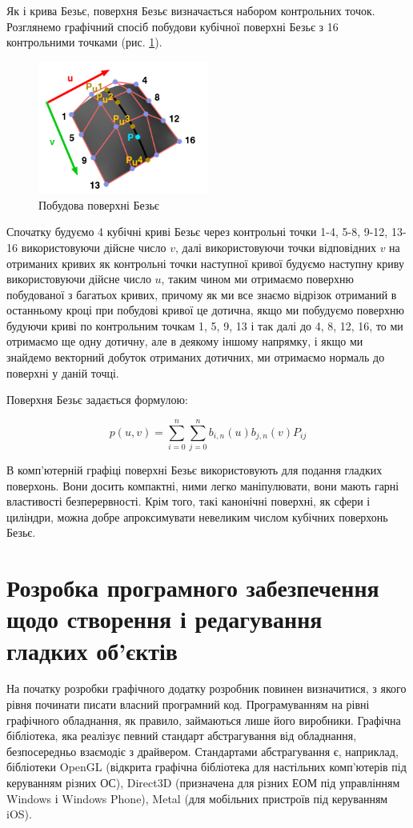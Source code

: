 \let\mypdfximage\pdfximage\def\pdfximage{\immediate\mypdfximage}\documentclass[14pt,a4paper]{extarticle}
\theoremstyle{definition}
\renewcommand{\[}{\begin{singlespace}\begin{equation*}}
\renewcommand{\]}{\end{equation*}\end{singlespace}}
\renewcommand{\+}{\discretionary{\mbox{\scriptsize$\hookleftarrow$}}{}{}}
\begin{document}
Як і крива Безьє, поверхня Безьє визначається набором контрольних точок. Розглянемо графічний спосіб побудови кубічної поверхні Безьє з 16 контрольними точками (рис. \ref{fig:bezier-surface}). 

\begin{figure}[!htb]
    \centering
    \includegraphics[width=0.5\textwidth]{bezier-surface.png}
    \caption{Побудова поверхні Безьє}\label{fig:bezier-surface}
\end{figure}

Спочатку будуємо 4 кубічні криві Безьє через контрольні точки 1-4, 5-8, 9-12, 13-16 використовуючи дійсне число $v$, далі використовуючи точки відповідних $v$ на отриманих кривих як контрольні точки наступної кривої будуємо наступну криву використовуючи дійсне число $u$, таким чином ми отримаємо поверхню побудованої з багатьох кривих, причому як ми все знаємо відрізок отриманий в останньому кроці при побудові кривої це дотична, якщо ми побудуємо поверхню будуючи криві по контрольним точкам 1, 5, 9, 13 і так далі до 4, 8, 12, 16, то ми отримаємо ще одну дотичну, але в деякому іншому напрямку, і якщо ми знайдемо векторний добуток отриманих дотичних, ми отримаємо нормаль до поверхні у даній точці.

Поверхня Безьє задається формулою:
\[p(u,v)=\sum_{i=0}^n\sum_{j=0}^n b_{i,n}(u) b_{j,n}(v) P_{ij}\]

В комп'ютерній графіці поверхні Безьє використовують для подання гладких поверхонь. Вони досить компактні, ними легко маніпулювати, вони мають гарні властивості безперервності. Крім того, такі канонічні поверхні, як сфери і циліндри, можна добре апроксимувати невеликим числом кубічних поверхонь Безьє.

\section{Розробка програмного забезпечення щодо створення і редагування гладких об'єктів}

На початку розробки графічного додатку розробник повинен визначитися, з якого рівня починати писати власний програмний код. Програмуванням на рівні графічного обладнання, як правило, займаються лише його виробники. Графічна бібліотека, яка реалізує певний стандарт абстрагування від обладнання, безпосередньо взаємодіє з драйвером. Стандартами абстрагування є, наприклад, бібліотеки OpenGL (відкрита графічна бібліотека для настільних комп'ютерів під керуванням різних ОС), Direct3D (призначена для різних ЕОМ під управлінням Windows і Windows Phone), Metal (для мобільних пристроїв під керуванням iOS). \cite{ryabin}
\end{document}
